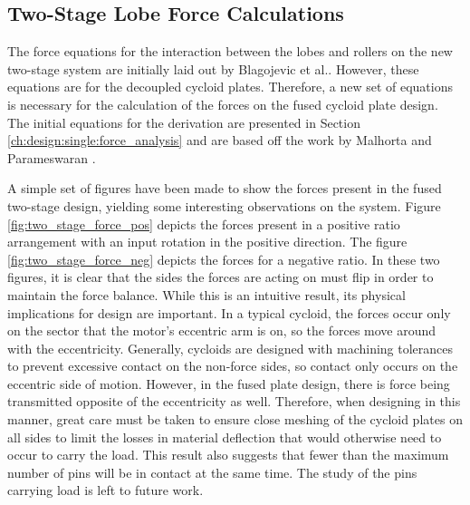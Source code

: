 \subsection{Two-Stage Lobe Force Calculations} \label{ch:dual:equtions:force}

The force equations for the interaction between the lobes and rollers on the new two-stage system are initially laid out by Blagojevic et al.\cite{ref:new_two_stage}. However, these equations are for the decoupled cycloid plates. Therefore, a new set of equations is necessary for the calculation of the forces on the fused cycloid plate design. The initial equations for the derivation are presented in Section \ref{ch:design:single:force_analysis} and are based off the work by Malhorta and Parameswaran \cite{ref:malhorta_2}. 

A simple set of figures have been made to show the forces present in the fused two-stage design, yielding some interesting observations on the system. Figure \ref{fig:two_stage_force_pos} depicts the forces present in a positive ratio arrangement with an input rotation in the positive direction. The figure \ref{fig:two_stage_force_neg} depicts the forces for a negative ratio. In these two figures, it is clear that the sides the forces are acting on must flip in order to maintain the force balance. While this is an intuitive result, its physical implications for design are important. In a typical cycloid, the forces occur only on the sector that the motor's eccentric arm is on, so the forces move around with the eccentricity. Generally, cycloids are designed with machining tolerances to prevent excessive contact on the non-force sides, so contact only occurs on the eccentric side of motion. However, in the fused plate design, there is force being transmitted opposite of the eccentricity as well. Therefore, when designing in this manner, great care must be taken to ensure close meshing of the cycloid plates on all sides to limit the losses in material deflection that would otherwise need to occur to carry the load. This result also suggests that fewer than the maximum number of pins will be in contact at the same time. The study of the pins carrying load is left to future work.

